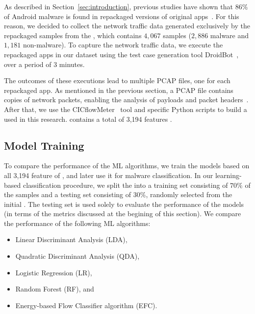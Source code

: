 As described in Section~\ref{sec:introduction}, previous studies have shown that $86\%$ of Android malware is found in repackaged
versions of original apps~\cite{DBLP:journals/tdsc/TianYRTP20,DBLP:conf/sp/ZhouJ12}. For this reason, we decided to collect the network traffic
data generated exclusively by the repackaged samples from the \cds, which contains $4,067$ samples ($2,886$ malware and $1,181$ non-malware).
To capture the network traffic data, we execute the repackaged apps in our dataset using the test case generation tool
DroidBot~\cite{DBLP:conf/icse/LiYGC17}, over a period of $3$ minutes.

The outcomes of these executions lead to multiple PCAP files, one for each repackaged app. As mentioned in the previous
section, a PCAP file contains copies of network packets, enabling the analysis of payloads and packet headers~\cite{DBLP:conf/iv/UhlarHR21}.
After that, we use the CICflowMeter~\cite{DBLP:conf/icissp/LashkariDMG17} tool and specific Python scripts to build a
\fds used in this research. \fds contains a total of 3,194 features .

\subsection{Model Training}

To compare the performance of the ML algorithms, we train the
models based on all 3,194 feature of \fds, and later use it for malware classification. In our learning-based classification procedure,
we split the \fds into a training set consisting of $70\%$
of the samples and a testing set consisting of $30\%$, randomly
selected from the initial \fds. The testing set is used solely
to evaluate the performance of the models (in terms of the metrics
discussed at the begining of this section).
We compare the performance of the following ML algorithms:


\begin{itemize}
  \item Linear Discriminant Analysis (LDA),
  \item Quadratic Discriminant Analysis (QDA),
  \item Logistic Regression (LR),
  \item Random Forest (RF), and
  \item Energy-based Flow Classifier algorithm (EFC).
\end{itemize}


